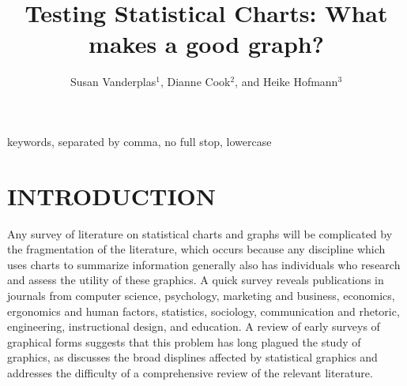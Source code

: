 \documentclass[letterpaper]{ar-1col}\usepackage[]{graphicx}\usepackage[]{color}
\begin{document}


\title{Testing Statistical Charts: What makes a good graph?}

\author{Susan Vanderplas$^1$, Dianne Cook$^2$, and  Heike Hofmann$^3$
}


\begin{abstract}
\end{abstract}

\begin{keywords}
keywords, separated by comma, no full stop, lowercase
\end{keywords}
\maketitle

\tableofcontents

\section{INTRODUCTION}
Any survey of literature on statistical charts and graphs will be complicated by the fragmentation of the literature, which occurs because any discipline which uses charts to summarize information generally also has individuals who research and assess the utility of these graphics. A quick survey reveals publications in journals from computer science, psychology, marketing and business, economics, ergonomics and human factors, statistics, sociology, communication and rhetoric, engineering, instructional design, and education. A review of early surveys of graphical forms suggests that this problem has long plagued the study of graphics, as \citet{funkhouserHistoricalDevelopmentGraphical1937} discusses the broad displines affected by statistical graphics and  \citet{kruskalVisionsMapsGraphs1977} addresses the difficulty of a comprehensive review of the relevant literature.
\end{document}
